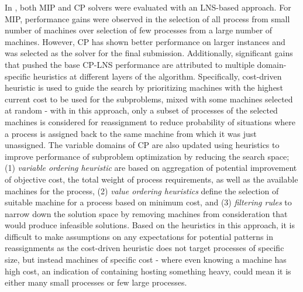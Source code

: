 \documentclass[a4paper,12pt]{Classes/RoboticsLaTeX}
\begin{document}
In \cite{mehta2012}, both MIP and CP solvers were evaluated with an LNS-based
approach. For MIP, performance gains were observed in the selection of
all process from small number of machines over selection of few
processes from a large number of machines. However, CP has shown better
performance on larger instances and was selected as the solver for the
final submission. Additionally, significant gains that pushed the base
CP-LNS performance are attributed to multiple domain-specific heuristics
at different layers of the algorithm. Specifically, cost-driven
heuristic is used to guide the search by prioritizing machines with the
highest current cost to be used for the subproblems, mixed with some
machines selected at random - with in this approach, only a subset of
processes of the selected machines is considered for reassignment to
reduce probability of situations where a process is assigned back to the
same machine from which it was just unassigned. The variable domains of
CP are also updated using heuristics to improve performance of
subproblem optimization by reducing the search space; (1) \emph{variable
ordering heuristic} are based on aggregation of potential improvement of
objective cost, the total weight of process requirements, as well as the
available machines for the process, (2) \emph{value ordering heuristics}
define the selection of suitable machine for a process based on minimum
cost, and (3) \emph{filtering rules} to narrow down the solution space
by removing machines from consideration that would produce infeasible
solutions. Based on the heuristics in this approach, it is difficult to
make assumptions on any expectations for potential patterns in
reassignments as the cost-driven heuristic does not target processes of
specific size, but instead machines of specific cost - where even
knowing a machine has high cost, an indication of containing hosting
something heavy, could mean it is either many small processes or few
large processes.
\end{document}
